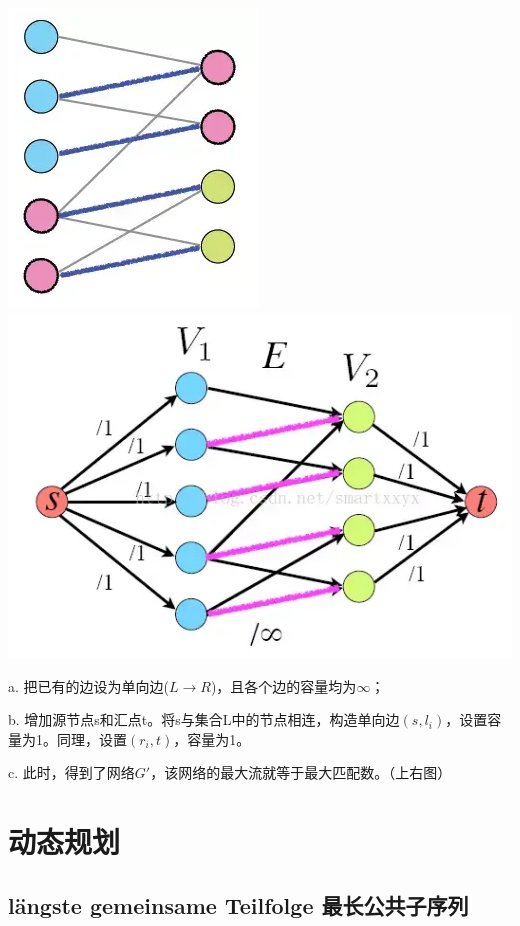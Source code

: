 \documentclass[a4paper]{article}    %
\begin{document}
\begin{center}
    \includegraphics[scale=0.5]{35.png}
    \includegraphics[scale=0.5]{36.png}
\end{center}

a. 把已有的边设为单向边($L\rightarrow R$)，且各个边的容量均为$\infty$；

b. 增加源节点s和汇点t。将s与集合L中的节点相连，构造单向边$(s,l_i)$，设置容量为1。同理，设置$(r_i,t)$，容量为1。

c. 此时，得到了网络$G'$，该网络的最大流就等于最大匹配数。（上右图）

\section{动态规划}

\subsection{längste gemeinsame Teilfolge 最长公共子序列}
\end{document}

